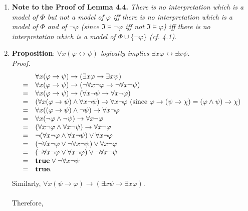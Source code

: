 \begin{enumerate}[1.]
%
\item \textbf{Note to the Proof of Lemma 4.4.} \textit{There is no interpretation which is a model of $\Phi$ but not a model of $\varphi$ iff there is no interpretation which is a model of $\Phi$ and of $\neg \varphi$ (since $\mathfrak{I} \models \neg \varphi$ iff not $\mathfrak{I} \models \varphi$) iff there is no interpretation which is a model of $\Phi \cup \{ \neg \varphi \}$ (cf. 4.1)}.
%
\item \textbf{Proposition}: \textit{$\forall x (\varphi \leftrightarrow \psi)$ logically implies $\exists x \varphi \leftrightarrow \exists x \psi$.}\\
\textit{Proof.}
\[
\begin{array}{ll}
\,  & \forall x (\varphi \rightarrow \psi) \rightarrow (\exists x \varphi \rightarrow \exists x \psi) \\
= & \forall x (\varphi \rightarrow \psi) \rightarrow (\neg \forall x \neg \varphi \rightarrow \neg \forall x \neg \psi) \\
= & \forall x (\varphi \rightarrow \psi) \rightarrow (\forall x \neg \psi \rightarrow \forall x \neg \varphi) \\
= & (\forall x (\varphi \rightarrow \psi) \land \forall x \neg \psi) \rightarrow \forall x \neg \varphi \mbox{  (since $\varphi \rightarrow (\psi \rightarrow \chi) = (\varphi \land \psi) \rightarrow \chi$)} \\
= & \forall x ( (\varphi \rightarrow \psi) \land \neg \psi) \rightarrow \forall x \neg \varphi \\
= & \forall x ( \neg \varphi \land \neg \psi ) \rightarrow \forall x \neg \varphi \\
= & ( \forall x \neg \varphi \land \forall x \neg \psi ) \rightarrow \forall x \neg \varphi \\
= & \neg ( \forall x \neg \varphi \land \forall x \neg \psi ) \lor \forall x \neg \varphi \\
= & (\neg \forall x \neg \varphi \lor \neg \forall x \neg \psi ) \lor \forall x \neg \varphi \\
= & (\neg \forall x \neg \varphi \lor \forall x \neg \varphi ) \lor \neg \forall x \neg \psi \\
= & \mbox{\bf true} \lor \neg \forall x \neg \psi \\
= & \mbox{\bf true}.
\end{array}
\]
Similarly, $\forall x (\psi \rightarrow \varphi) \rightarrow (\exists x \psi \rightarrow \exists x \varphi)$.\\
\\Therefore,

\end{enumerate}
